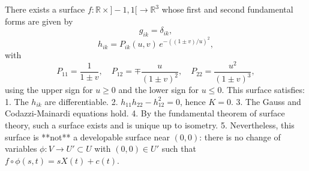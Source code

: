 There exists a surface $f: \mathbb{R} \times {]-1,1[} \to \mathbb{R}^3$ whose first and second fundamental forms are given by
$$g_{ik} = \delta_{ik},$$
$$h_{ik} = P_{ik}(u,v) \, e^{-((1 \pm v)/u)^2},$$
with
$$P_{11} = \frac{1}{1 \pm v}, \quad P_{12} = \mp \frac{u}{(1 \pm v)^2}, \quad P_{22} = \frac{u^2}{(1 \pm v)^3},$$
using the upper sign for $u \geq 0$ and the lower sign for $u \leq 0$. This surface satisfies:
1. The $h_{ik}$ are differentiable.
2. $h_{11}h_{22} - h_{12}^2 = 0$, hence $K = 0$.
3. The Gauss and Codazzi-Mainardi equations hold.
4. By the fundamental theorem of surface theory, such a surface exists and is unique up to isometry.
5. Nevertheless, this surface is **not** a developable surface near $(0,0)$: there is no change of variables $\phi: V \to U' \subset U$ with $(0,0) \in U'$ such that $f \circ \phi(s,t) = sX(t) + c(t)$.
